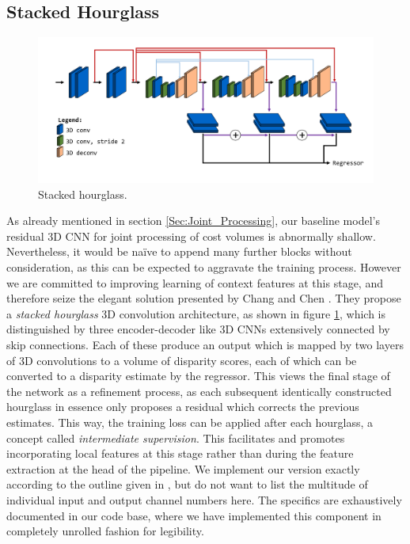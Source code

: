 \documentclass[runningheads]{llncs}
\begin{document}
\subsection{Stacked Hourglass}
\begin{figure}[h]
\vspace{-1px}
  \centering
    \includegraphics[width=0.9\linewidth]{Stacked Hourglass Architecture.png}
    \caption{Stacked hourglass.}
    \label{Fig:Stacked_hourglass}
\end{figure}
As already mentioned in section \ref{Sec:Joint_Processing}, our baseline model's residual 3D CNN for joint processing of cost volumes is abnormally shallow. Nevertheless, it would be naïve to append many further blocks without consideration, as this can be expected to aggravate the training process. However we are committed to improving learning of context features at this stage, and therefore seize the elegant solution presented by Chang and Chen \cite{PSM-Net}. They propose a \textit{stacked hourglass} 3D convolution architecture, as shown in figure \ref{Fig:Stacked_hourglass}, which is distinguished by three encoder-decoder like 3D CNNs extensively connected by skip connections. Each of these produce an output which is mapped by two layers of 3D convolutions to a volume of disparity scores, each of which can be converted to a disparity estimate by the regressor. This views the final stage of the network as a refinement process, as each subsequent identically constructed hourglass in essence only proposes a residual which corrects the previous estimates. This way, the training loss can be applied after each hourglass, a concept called \textit{intermediate supervision}. This facilitates and promotes incorporating local features at this stage rather than during the feature extraction at the head of the pipeline. We implement our version exactly according to the outline given in \cite{PSM-Net}, but do not want to list the multitude of individual input and output channel numbers here. The specifics are exhaustively documented in our code base, where we have implemented this component in completely unrolled fashion for legibility. 
\end{document}

